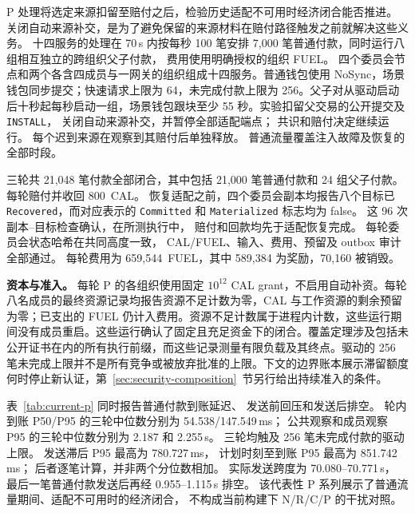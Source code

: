 P 处理将选定来源扣留至赔付之后，检验历史适配不可用时经济闭合能否推进。关闭自动来源补交，是为了避免保留的来源材料在赔付路径触发之前就解决这些义务。
十四服务的处理在 70\,s 内按每秒 100 笔安排
7,000 笔普通付款，同时运行八组相互独立的跨组织父子付款，
费用使用明确授权的组织 FUEL。
四个委员会节点和两个各含四成员与一网关的组织组成十四服务。普通钱包使用 NoSync，场景钱包同步提交；快速请求上限为 64，未完成付款上限为 256。父子对从驱动启动后十秒起每秒启动一组，场景钱包跟块至少 55 秒。实验扣留父交易的公开提交及 \texttt{INSTALL}，
关闭自动来源补交，并暂停全部适配端点；
共识和赔付决定继续运行。
每个迟到来源在观察到其赔付后单独释放。
普通流量覆盖注入故障及恢复的全部时段。

三轮共 21,048 笔付款全部闭合，其中包括
21,000 笔普通付款和 24 组父子付款。
每轮赔付并收回 800~CAL。
恢复适配之前，四个委员会副本均报告八个目标已
\texttt{Recovered}，而对应表示的
\texttt{Committed} 和 \texttt{Materialized} 标志均为 false。
这 96 次副本--目标检查确认，在所测执行中，
赔付和回款均先于适配恢复完成。
每轮委员会状态哈希在共同高度一致，
CAL/FUEL、输入、费用、预留及 outbox 审计全部通过。
每轮费用为 659,544~FUEL，其中
589,384 为奖励，70,160 被销毁。

\noindent\textbf{资本与准入。}
每轮 P 的各组织使用固定 $10^{12}$ CAL grant，不启用自动补资。每轮八名成员的最终资源记录均报告资源不足计数为零，CAL 与工作资源的剩余预留为零；已支出的 FUEL 仍计入费用。资源不足计数属于进程内计数，这些运行期间没有成员重启。这些运行确认了固定且充足资金下的闭合。覆盖定理涉及包括未公开证书在内的所有执行前缀，而这些记录测量有限负载及其终点。驱动的 256 笔未完成上限并不是所有竞争或被放弃批准的上限。下文的边界账本展示滞留额度何时停止新认证，第~\ref{sec:security-composition}~节另行给出持续准入的条件。

表~\ref{tab:current-p} 同时报告普通付款到账延迟、
发送前回压和发送后排空。
轮内到账 P50/P95 的三轮中位数分别为
54.538/147.549\,ms；
公共观察和成员观察 P95 的三轮中位数分别为
2.187 和 2.255\,s。
三轮均触及 256 笔未完成付款的驱动上限。
发送滞后 P95 最高为 780.727\,ms，
计划时刻至到账 P95 最高为 851.742\,ms；
后者逐笔计算，并非两个分位数相加。
实际发送跨度为 70.080--70.771\,s，
最后一笔普通付款发送后再经 0.955--1.115\,s 排空。
该代表性 P 系列展示了普通流量期间、适配不可用时的经济闭合，
不构成当前构建下 N/R/C/P 的干扰对照。

